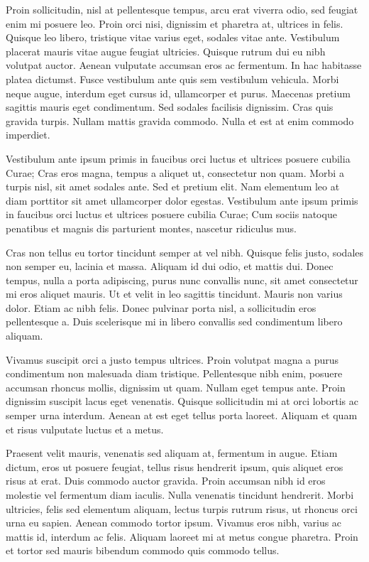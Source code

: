 Proin sollicitudin, nisl at pellentesque tempus, arcu erat viverra
odio, sed feugiat enim mi posuere leo. Proin orci nisi, dignissim
et pharetra at, ultrices in felis. Quisque leo libero, tristique vitae
varius eget, sodales vitae ante. Vestibulum placerat mauris vitae
augue feugiat ultricies. Quisque rutrum dui eu nibh volutpat auctor.
Aenean vulputate accumsan eros ac fermentum. In hac habitasse platea
dictumst. Fusce vestibulum ante quis sem vestibulum vehicula. Morbi
neque augue, interdum eget cursus id, ullamcorper et purus. Maecenas
pretium sagittis mauris eget condimentum. Sed sodales facilisis dignissim.
Cras quis gravida turpis. Nullam mattis gravida commodo. Nulla et
est at enim commodo imperdiet.

Vestibulum ante ipsum primis in faucibus orci luctus et ultrices posuere
cubilia Curae; Cras eros magna, tempus a aliquet ut, consectetur non
quam. Morbi a turpis nisl, sit amet sodales ante. Sed et pretium elit.
Nam elementum leo at diam porttitor sit amet ullamcorper dolor egestas.
Vestibulum ante ipsum primis in faucibus orci luctus et ultrices posuere
cubilia Curae; Cum sociis natoque penatibus et magnis dis parturient
montes, nascetur ridiculus mus.

Cras non tellus eu tortor tincidunt semper at vel nibh. Quisque felis
justo, sodales non semper eu, lacinia et massa. Aliquam id dui odio,
et mattis dui. Donec tempus, nulla a porta adipiscing, purus nunc
convallis nunc, sit amet consectetur mi eros aliquet mauris. Ut et
velit in leo sagittis tincidunt. Mauris non varius dolor. Etiam ac
nibh felis. Donec pulvinar porta nisl, a sollicitudin eros pellentesque
a. Duis scelerisque mi in libero convallis sed condimentum libero
aliquam.

Vivamus suscipit orci a justo tempus ultrices. Proin volutpat magna
a purus condimentum non malesuada diam tristique. Pellentesque nibh
enim, posuere accumsan rhoncus mollis, dignissim ut quam. Nullam eget
tempus ante. Proin dignissim suscipit lacus eget venenatis. Quisque
sollicitudin mi at orci lobortis ac semper urna interdum. Aenean at
est eget tellus porta laoreet. Aliquam et quam et risus vulputate
luctus et a metus.

Praesent velit mauris, venenatis sed aliquam at, fermentum in augue.
Etiam dictum, eros ut posuere feugiat, tellus risus hendrerit ipsum,
quis aliquet eros risus at erat. Duis commodo auctor gravida. Proin
accumsan nibh id eros molestie vel fermentum diam iaculis. Nulla venenatis
tincidunt hendrerit. Morbi ultricies, felis sed elementum aliquam,
lectus turpis rutrum risus, ut rhoncus orci urna eu sapien. Aenean
commodo tortor ipsum. Vivamus eros nibh, varius ac mattis id, interdum
ac felis. Aliquam laoreet mi at metus congue pharetra. Proin et tortor
sed mauris bibendum commodo quis commodo tellus.

